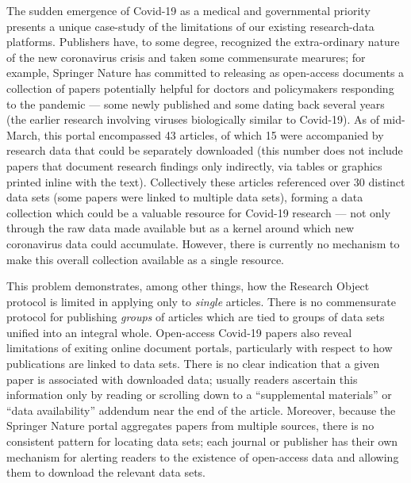 \documentclass[10pt,letterpaper]{article}
\newcommand{\p}[1]{

\vspace{.85em}#1}
\newcommand{\q}[1]{{\fontfamily{qcr}\selectfont ``}#1{\fontfamily{qcr}\selectfont ''}}
\begin{document}
{\p{The sudden emergence of Covid-19 as a 
medical and governmental priority presents a 
unique case-study of the limitations of our 
existing research-data platforms.  Publishers 
have, to some degree, recognized the extra-ordinary 
nature of the new coronavirus crisis and 
taken some commensurate mearures; for example, 
Springer Nature has committed to releasing as 
open-access documents a collection of papers 
potentially helpful for doctors and 
policymakers responding to the pandemic --- 
some newly published and some dating back several 
years (the earlier research involving viruses 
biologically similar to Covid-19).  As of 
mid-March, this portal encompassed 43 articles, 
of which 15 were accompanied by research data that 
could be separately downloaded (this number does 
not include papers that document research 
findings only indirectly, via tables or graphics 
printed inline with the text).  Collectively 
these articles referenced over 30 distinct data 
sets (some papers were linked to multiple 
data sets), forming a data collection which could 
be a valuable resource for Covid-19 research --- 
not only through the raw data made available 
but as a kernel around which new coronavirus data 
could accumulate.  However, there is currently no 
mechanism to make this overall collection available 
as a single resource.}

\p{This problem demonstrates, among other things, 
how the Research Object protocol is limited in applying 
only to \textit{single} articles.  There is no 
commensurate protocol for publishing \textit{groups} 
of articles which are tied to groups of data sets unified 
into an integral whole.  Open-access Covid-19 papers also 
reveal limitations of exiting online document portals, 
particularly with respect to how publications are 
linked to data sets.  There is no clear indication that a 
given paper is associated with downloaded data; usually 
readers ascertain this information only by reading or 
scrolling down to a \q{supplemental materials} or 
\q{data availability} addendum near the end of the article.  
Moreover, because the Springer Nature portal aggregates 
papers from multiple sources, there is no consistent 
pattern for locating data sets; each journal or 
publisher has their own mechanism for alerting readers 
to the existence of open-access data and allowing them 
to download the relevant data sets.}

}
\end{document}
